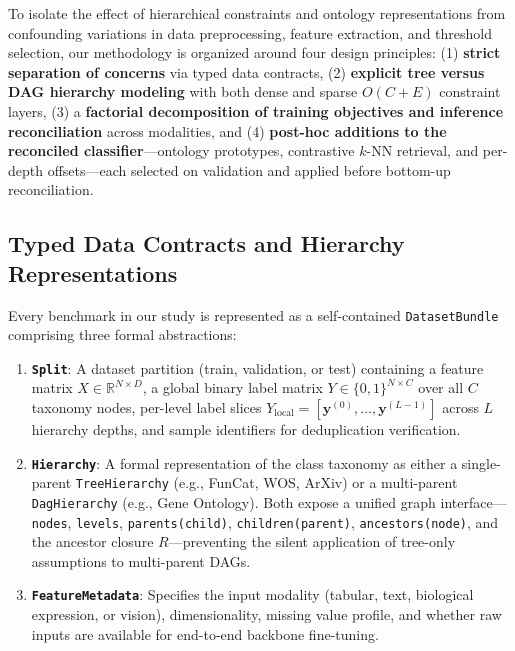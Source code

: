 \documentclass[preprint,12pt]{elsarticle}
\begin{document}
To isolate the effect of hierarchical constraints and ontology representations
from confounding variations in data preprocessing, feature extraction, and
threshold selection, our methodology is organized around four design
principles: (1) \textbf{strict separation of concerns} via typed data
contracts, (2) \textbf{explicit tree versus DAG hierarchy modeling} with both
dense and sparse $O(C{+}E)$ constraint layers, (3) a \textbf{factorial
decomposition of training objectives and inference reconciliation} across
modalities, and (4) \textbf{post-hoc additions to the reconciled
classifier}---ontology prototypes, contrastive $k$-NN retrieval, and
per-depth offsets---each selected on validation and applied before
bottom-up reconciliation.

\subsection{Typed Data Contracts and Hierarchy Representations}

Every benchmark in our study is represented as a self-contained
\texttt{DatasetBundle} comprising three formal abstractions:

\begin{enumerate}[leftmargin=*,nosep]
  \item \textbf{\texttt{Split}}: A dataset partition (train, validation, or
    test) containing a feature matrix $X \in \mathbb{R}^{N \times D}$, a
    global binary label matrix $Y \in \{0,1\}^{N \times C}$ over all $C$
    taxonomy nodes, per-level label slices
    $Y_{\text{local}} = [\mathbf{y}^{(0)}, \ldots, \mathbf{y}^{(L-1)}]$ across
    $L$ hierarchy depths, and sample identifiers for deduplication verification.
  \item \textbf{\texttt{Hierarchy}}: A formal representation of the class
    taxonomy as either a single-parent \texttt{TreeHierarchy} (e.g., FunCat,
    WOS, ArXiv) or a multi-parent \texttt{DagHierarchy} (e.g., Gene Ontology).
    Both expose a unified graph interface---\texttt{nodes}, \texttt{levels},
    \texttt{parents(child)}, \texttt{children(parent)},
    \texttt{ancestors(node)}, and the ancestor closure $R$---preventing the
    silent application of tree-only assumptions to multi-parent DAGs.
  \item \textbf{\texttt{FeatureMetadata}}: Specifies the input modality
    (tabular, text, biological expression, or vision), dimensionality, missing
    value profile, and whether raw inputs are available for end-to-end
    backbone fine-tuning.
\end{enumerate}
\end{document}

